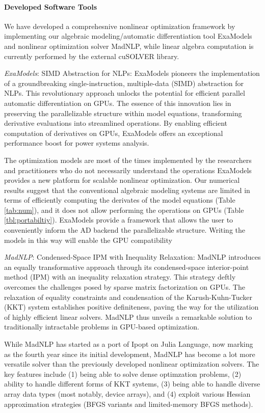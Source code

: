 \documentclass{article}
\begin{document}
\paragraph{Developed Software Tools}
We have developed a comprehesnive nonlinear optimization framework by implementing our algebraic modeling/automatic differentiation tool ExaModels and nonlinear optimization solver MadNLP, while linear algebra computation is currently performed by the external cuSOLVER library. 

{\it ExaModels}: SIMD Abstraction for NLPs: ExaModels pioneers the implementation of a groundbreaking single-instruction, multiple-data (SIMD) abstraction for NLPs. This revolutionary approach unlocks the potential for efficient parallel automatic differentiation on GPUs. The essence of this innovation lies in preserving the parallelizable structure within model equations, transforming derivative evaluations into streamlined operations. By enabling efficient computation of derivatives on GPUs, ExaModels offers an exceptional performance boost for power systems analysis.

The optimization models are most of the times implemented by the researchers and practitioners who do not necessarily understand the operations 
ExaModels provides a new platform for scalable nonlinear optimization. Our numerical results suggest that the conventional algebraic modeling systems are limited in terms of efficiently computing the derivates of the model equations (Table \ref{tab:num}), and it does not allow performing the operations on GPUs (Table \ref{tbl:portabiltiy}). ExaModels provide a framework that allows the user to conveniently inform the AD backend the parallelizable structure. Writing the models in this way will enable the GPU compatibility 

{\it MadNLP}: Condensed-Space IPM with Inequality Relaxation: MadNLP introduces an equally transformative approach through its condensed-space interior-point method (IPM) with an inequality relaxation strategy. This strategy deftly overcomes the challenges posed by sparse matrix factorization on GPUs. The relaxation of equality constraints and condensation of the Karush-Kuhn-Tucker (KKT) system establishes positive definiteness, paving the way for the utilization of highly efficient linear solvers. MadNLP thus unveils a remarkable solution to traditionally intractable problems in GPU-based optimization.

While MadNLP has started as a port of Ipopt on Julia Language, now marking as the fourth year since its initial development, MadNLP has become a lot more versatile solver than the previously developed nonlinear optimization solvers. The key features include (1) being able to solve dense optimzation problems, (2) ability to handle different forms of KKT systems, (3) being able to handle diverse array data types (most notably, device arrays), and (4) exploit various Hessian approximation strategies (BFGS variants and limited-memory BFGS methods).
\end{document}
